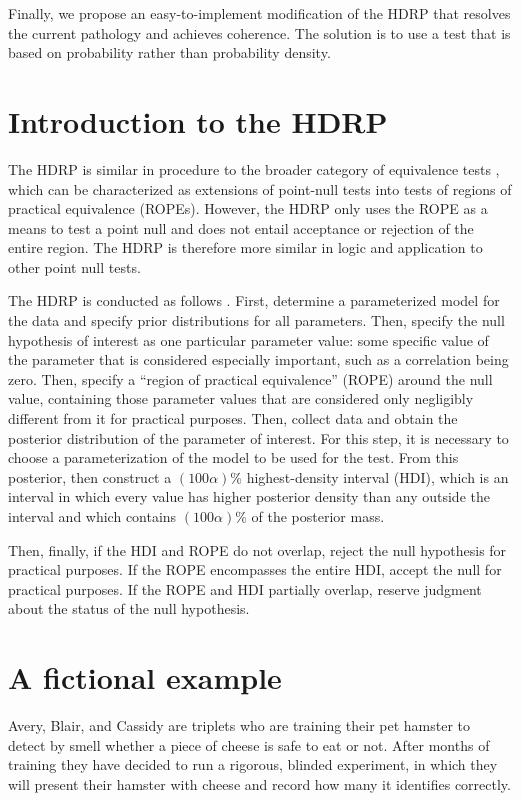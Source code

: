 \documentclass[9pt,twocolumn,twoside]{cidlab-draft}\templatetype{cidlab-invited}
\newcommand{\hdr}{HDRP}
\begin{document}
Finally, we propose an easy-to-implement modification of the \hdr{} that resolves the current pathology and achieves coherence. The solution is to use a test that is based on probability rather than probability density. 


\section*{Introduction to the \hdr{}}

The \hdr{} is similar in procedure to the broader category of equivalence tests \cite{RogersEtAl1993}, which can be characterized as extensions of point-null tests into tests of regions of practical equivalence (ROPEs).
However, the \hdr{} only uses the ROPE as a means to test a point null and does not entail acceptance or rejection of the entire region. The \hdr{} is therefore more similar in logic and application to other point null tests.

The \hdr{} is conducted as follows \cite{Kruschke2011}.  
First, determine a parameterized model for the data and specify prior distributions for all parameters. 
Then, specify the null hypothesis of interest as one particular parameter value: some specific value of the parameter that is considered especially important, such as a correlation being zero.
Then, specify a ``region of practical equivalence'' (ROPE) around the null value, containing those parameter values that are considered only negligibly different from it for practical purposes.
Then, collect data and obtain the posterior distribution of the parameter of interest. For this step, it is necessary to choose a parameterization of the model to be used for the test. 
From this posterior, then construct a $(100\alpha)\%$ highest-density interval (HDI), which is an interval in which every value has higher posterior density than any outside the interval and which contains $(100\alpha)\%$ of the posterior mass.

Then, finally, if the HDI and ROPE do not overlap, reject the null hypothesis for practical purposes. If the ROPE encompasses the entire HDI, accept the null for practical purposes. If the ROPE and HDI partially overlap, reserve judgment about the status of the null hypothesis. 


\section*{A fictional example}
    
Avery, Blair, and Cassidy are triplets who are training their pet hamster to detect by smell whether a piece of cheese is safe to eat or not. After months of training they have decided to run a rigorous, blinded experiment, in which they will present their hamster with cheese and record how many it identifies correctly.
\end{document}

